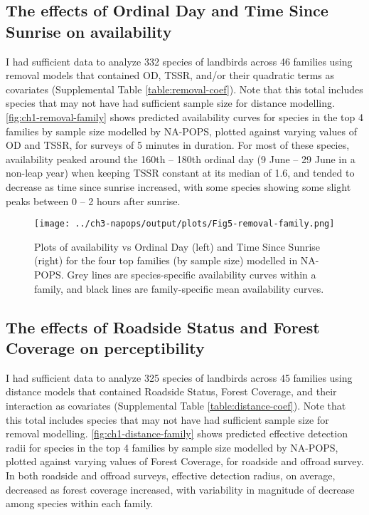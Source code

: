 \subsection{The effects of Ordinal Day and Time Since Sunrise on availability}
\par I had sufficient data to analyze 332 species of landbirds across 46 families using removal models that contained OD, TSSR, and/or their quadratic terms as covariates (Supplemental Table \ref{table:removal-coef}). Note that this total includes species that may not have had sufficient sample size for distance modelling. \autoref{fig:ch1-removal-family} shows predicted availability curves for species in the top 4 families by sample size modelled by NA-POPS, plotted against varying values of OD and TSSR, for surveys of 5 minutes in duration. For most of these species, availability peaked around the 160th – 180th ordinal day (9 June – 29 June in a non-leap year) when keeping TSSR constant at its median of 1.6, and tended to decrease as time since sunrise increased, with some species showing some slight peaks between 0 – 2 hours after sunrise. 

\begin{figure}[h]
	\centering
	\texttt{[image: ../ch3-napops/output/plots/Fig5-removal-family.png]}
	\caption{\label{fig:ch1-removal-family}Plots of availability vs Ordinal Day (left) and Time Since Sunrise (right) for the four top families (by sample size) modelled in NA-POPS. Grey lines are species-specific availability curves within a family, and black lines are family-specific mean availability curves.}
\end{figure}

\subsection{The effects of Roadside Status and Forest Coverage on perceptibility}
\par I had sufficient data to analyze 325 species of landbirds across 45 families using distance models that contained Roadside Status, Forest Coverage, and their interaction as covariates (Supplemental Table \ref{table:distance-coef}). Note that this total includes species that may not have had sufficient sample size for removal modelling. \autoref{fig:ch1-distance-family} shows predicted effective detection radii for species in the top 4 families by sample size modelled by NA-POPS, plotted against varying values of Forest Coverage, for roadside and offroad survey. In both roadside and offroad surveys, effective detection radius, on average, decreased as forest coverage increased, with variability in magnitude of decrease among species within each family. 

